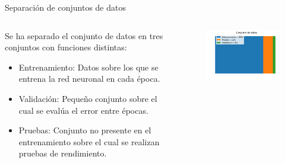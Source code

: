 \documentclass[10pt]{beamer}
\begin{document}
\begin{frame}{Separación de conjuntos de datos}
    
    \begin{columns}
        \begin{column}{0.5\textwidth}
            Se ha separado el conjunto de datos en tres conjuntos con funciones distintas:
            \begin{itemize}
                \item \alert{Entrenamiento}: Datos sobre los que se entrena la red neuronal en cada época.
                \item \alert{Validación}: Pequeño conjunto sobre el cual se evalúa el error entre épocas.
                \item \alert{Pruebas}: Conjunto no presente en el entrenamiento sobre el cual se realizan pruebas de rendimiento.
            \end{itemize} 
        \end{column}
        \begin{column}{0.5\textwidth}
            \begin{table}[!h]
                \centering
            \end{table}
            \begin{figure}[!h] 
                \centering
                \includegraphics[width=\textwidth]{../img/dataset1}

\end{figure}
\end{column}
\end{columns}
\end{frame}
\end{document}
